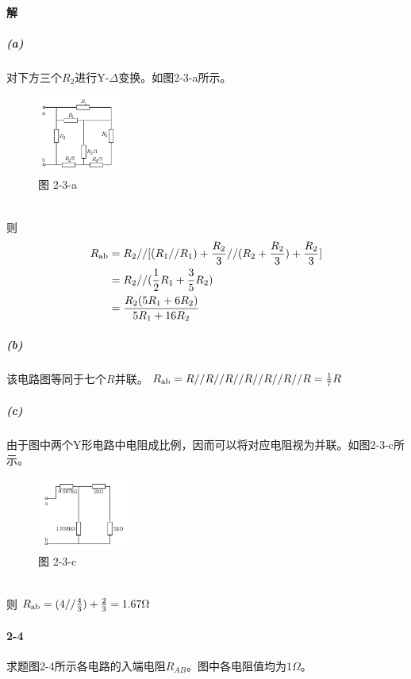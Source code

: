 \documentclass[hyperref, UTF8]{ctexart}
\begin{document}
\paragraph{解}
\subparagraph{(a)} 对下方三个$R_2$进行Y-$\Delta$变换。如图2-3-a所示。
\begin{figure}[!htb]
  \centering
  \includegraphics[width=0.244\textwidth]{p2-3-a-sol.png}
  \caption*{图 2-3-a}
\end{figure} \\
则
\begin{align*}
R_{\rm ab} &=
R_2//[(R_1//R_1)+
\frac{R_2}{3}//(R_2+\frac{R_2}{3})+\frac{R_2}{3}] \\
&= R_2//(\frac{1}{2}R_1+\frac{3}{5}R_2) \\
&= \frac{R_2(5R_1+6R_2)}{5R_1+16R_2}
\end{align*}
\subparagraph{(b)} 该电路图等同于七个$R$并联。
$R_{\rm ab}=R//R//R//R//R//R//R=\frac{1}{7}R$
\subparagraph{(c)} 由于图中两个Y形电路中电阻成比例，因而可以将对应电阻视为并联。如图2-3-c所示。
\begin{figure}[!htb]
  \centering
  \includegraphics[width=0.267\textwidth]{p2-3-c-sol.png}
  \caption*{图 2-3-c}
\end{figure} \\
则
$R_{\rm ab}=(4//\frac{4}{3})+\frac{2}{3}=1.67\Omega$

\paragraph{2-4}\label{2-4}
求题图2-4所示各电路的入端电阻$R_{AB}$。图中各电阻值均为$1\Omega$。
\end{document}
